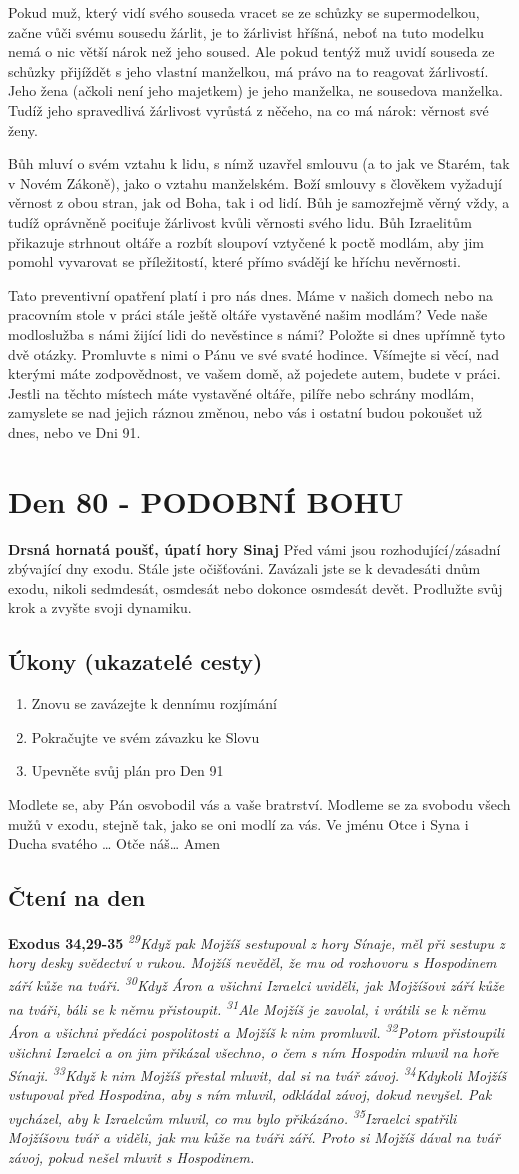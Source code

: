 \documentclass[11pt]{article}
\newcommand{\zacatekDvanactyTyden}{
\textbf{Drsná hornatá poušť, úpatí hory Sinaj} \newline 
Před vámi jsou rozhodující/zásadní zbývající dny exodu. Stále jste očišťováni. Zavázali jste se k devadesáti dnům exodu, nikoli sedmdesát, osmdesát nebo dokonce osmdesát devět. Prodlužte svůj krok a zvyšte svoji dynamiku.

\subsection*{Úkony (ukazatelé cesty)}
\begin{enumerate}
  \item Znovu se zavázejte k dennímu rozjímání
  \item Pokračujte ve svém závazku ke Slovu
  \item Upevněte svůj plán pro Den 91
\end{enumerate}
Modlete se, aby Pán osvobodil vás a vaše bratrství. \newline
Modleme se za svobodu všech mužů v exodu, stejně tak, jako se oni modlí za vás.\newline
Ve jménu Otce i Syna i Ducha svatého …  Otče náš… Amen
}
\begin{document}
Pokud muž, který vidí svého souseda vracet se ze schůzky se supermodelkou, začne vůči svému sousedu žárlit, je to žárlivist
hříšná, neboť na tuto modelku nemá o nic větší nárok než jeho soused. Ale pokud tentýž muž uvidí souseda ze schůzky přijíždět s
jeho vlastní manželkou, má právo na to reagovat žárlivostí. Jeho žena (ačkoli není jeho majetkem) je jeho manželka, ne sousedova
manželka. Tudíž jeho spravedlivá žárlivost vyrůstá z něčeho, na co má nárok: věrnost své ženy.

Bůh mluví o svém vztahu k lidu, s nímž uzavřel smlouvu (a to jak ve Starém, tak v Novém Zákoně), jako o vztahu manželském.
Boží smlouvy s člověkem vyžadují věrnost z obou stran, jak od Boha, tak i od lidí. Bůh je samozřejmě věrný vždy, a tudíž
oprávněně pociťuje žárlivost kvůli věrnosti svého lidu. Bůh Izraelitům přikazuje strhnout oltáře a rozbít sloupoví vztyčené k poctě
modlám, aby jim pomohl vyvarovat se příležitostí, které přímo svádějí ke hříchu nevěrnosti.

Tato preventivní opatření platí i pro nás dnes. Máme v našich domech nebo na pracovním stole v práci stále ještě oltáře vystavěné
našim modlám? Vede naše modloslužba s námi žijící lidi do nevěstince s námi? Položte si dnes upřímně tyto dvě otázky.
Promluvte s nimi o Pánu ve své svaté hodince. Všímejte si věcí, nad kterými máte zodpovědnost, ve vašem domě, až pojedete
autem, budete v práci. Jestli na těchto místech máte vystavěné oltáře, pilíře nebo schrány modlám, zamyslete se nad jejich ráznou
změnou, nebo vás i ostatní budou pokoušet už dnes, nebo ve Dni 91.


\newpage
\section{Den 80 - PODOBNÍ BOHU}
\zacatekDvanactyTyden
\subsection*{Čtení na den}
\textbf{Exodus 34,29-35}
\newline
\textit{
\textsuperscript{29}Když pak Mojžíš sestupoval z hory Sínaje, měl při sestupu z hory desky svědectví v rukou. Mojžíš nevěděl, že mu od rozhovoru s Hospodinem září kůže na tváři.
\textsuperscript{30}Když Áron a všichni Izraelci uviděli, jak Mojžíšovi září kůže na tváři, báli se k němu přistoupit.
\textsuperscript{31}Ale Mojžíš je zavolal, i vrátili se k němu Áron a všichni předáci pospolitosti a Mojžíš k nim promluvil.
\textsuperscript{32}Potom přistoupili všichni Izraelci a on jim přikázal všechno, o čem s ním Hospodin mluvil na hoře Sínaji.
\textsuperscript{33}Když k nim Mojžíš přestal mluvit, dal si na tvář závoj.
\textsuperscript{34}Kdykoli Mojžíš vstupoval před Hospodina, aby s ním mluvil, odkládal závoj, dokud nevyšel. Pak vycházel, aby k Izraelcům mluvil, co mu bylo přikázáno.
\textsuperscript{35}Izraelci spatřili Mojžíšovu tvář a viděli, jak mu kůže na tváři září. Proto si Mojžíš dával na tvář závoj, pokud nešel mluvit s Hospodinem.
}
\end{document}
